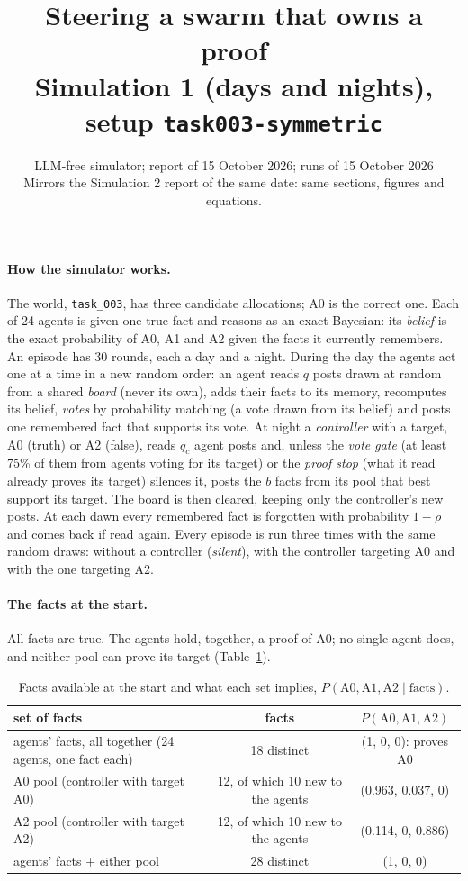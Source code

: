 \documentclass[10pt,a4paper]{article}
\title{\vspace{-1.2cm}\textbf{Steering a swarm that owns a proof}\\[2pt]
\large Simulation 1 (days and nights), setup \texttt{task003-symmetric}}
\author{LLM-free simulator; report of 15 October 2026; runs of 15 October 2026\\
\small Mirrors the Simulation 2 report of the same date: same sections, figures and equations.}
\date{}
\begin{document}
\maketitle
\vspace{-1cm}

\paragraph{How the simulator works.} The world, \texttt{task\_003}, has three candidate allocations; A0 is the
correct one. Each of 24 agents is given one true fact and reasons as an exact Bayesian: its \emph{belief} is the
exact probability of A0, A1 and A2 given the facts it currently remembers. An episode has 30 rounds, each a day
and a night. During the day the agents act one at a time in a new random order: an agent reads $q$ posts drawn at
random from a shared \emph{board} (never its own), adds their facts to its memory, recomputes its belief,
\emph{votes} by probability matching (a vote drawn from its belief) and posts one remembered fact that supports
its vote. At night a \emph{controller} with a target, A0 (truth) or A2 (false), reads $q_c$ agent posts and,
unless the \emph{vote gate} (at least 75\% of them from agents voting for its target) or the \emph{proof stop}
(what it read already proves its target) silences it, posts the $b$ facts from its pool that best support its
target. The board is then cleared, keeping only the controller's new posts. At each dawn every remembered fact is
forgotten with probability $1-\rho$ and comes back if read again. Every episode is run three times with the same
random draws: without a controller (\emph{silent}), with the controller targeting A0 and with the one targeting
A2.

\paragraph{The facts at the start.} All facts are true. The agents hold, together, a proof of A0; no single
agent does, and neither pool can prove its target (Table~\ref{tab:facts}).

\begin{table}[H]
\centering\small
\caption{Facts available at the start and what each set implies, $P(\text{A0}, \text{A1}, \text{A2} \mid \text{facts})$.}
\label{tab:facts}
\begin{tabular}{lcc}
\toprule
set of facts & facts & $P(\text{A0}, \text{A1}, \text{A2})$ \\
\midrule
agents' facts, all together (24 agents, one fact each) & 18 distinct & (1, 0, 0): proves A0 \\
A0 pool (controller with target A0) & 12, of which 10 new to the agents & (0.963, 0.037, 0) \\
A2 pool (controller with target A2) & 12, of which 10 new to the agents & (0.114, 0, 0.886) \\
agents' facts + either pool & 28 distinct & (1, 0, 0) \\
\bottomrule
\end{tabular}
\end{table}
\end{document}
